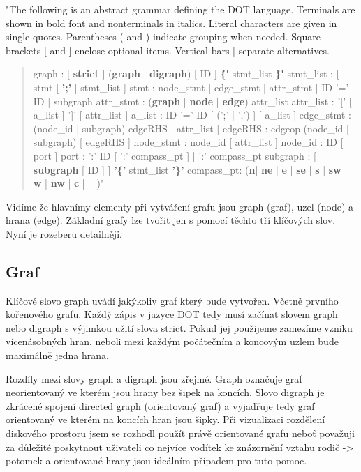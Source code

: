\documentclass[color,table,oneside,nolot,nolof]{fithesis}
\begin{document}
	"The following is an abstract grammar defining the DOT language. Terminals are shown in bold font and nonterminals in italics. Literal characters are given in single quotes. Parentheses
	( and ) indicate grouping when needed. Square brackets [ and ] enclose optional items. Vertical bars | separate alternatives.
	\begin{quotation}
	graph			:		[ \textbf{strict} ] (\textbf{graph} | \textbf{digraph}) [ ID ] \textbf{\'\{\'} stmt\_list \textbf{\'\}\'}
	stmt\_list :		[ stmt [ \textbf{';'} ] stmt\_list ]
	stmt			:		node\_stmt
	|							edge\_stmt
	|							attr\_stmt
	|							ID '=' ID
	|							subgraph
	attr\_stmt	:	(\textbf{graph} | \textbf{node} | \textbf{edge}) attr\_list
	attr\_list	:	'[' [ a\_list ] ']' [ attr\_list ]
	a\_list  	:	ID '=' ID [ (';' | ',') ] [ a\_list ]
	edge\_stmt	:	(node\_id | subgraph) edgeRHS [ attr\_list ]
	edgeRHS		:	edgeop (node\_id | subgraph) [ edgeRHS ]
	node\_stmt	:	node\_id [ attr\_list ]
	node\_id		:	ID [ port ]
	port			:	':' ID [ ':' compass\_pt ]
	|						':' compass\_pt
	subgraph	:	[ \textbf{subgraph} [ ID ] ] \textbf{'\{'} stmt\_list \textbf{'\}'}
	compass\_pt:	(\textbf{n}| \textbf{ne} | \textbf{e} | \textbf{se} | \textbf{s} | \textbf{sw} | \textbf{w}  | \textbf{nw} | \textbf{c} | \textbf{\_})"
	\end{quotation}

	Vidíme že hlavnímy elementy při vytváření grafu jsou graph (graf), uzel (node) a hrana (edge). Základní grafy lze tvořit jen s pomocí těchto tří klíčových slov. Nyní je rozeberu detailněji.

\subsection{Graf}
	Klíčové slovo graph uvádí jakýkoliv graf který bude vytvořen. Včetně prvního kořenového grafu. Každý zápis v jazyce DOT tedy musí začínat slovem graph nebo digraph s výjimkou užití slova
	strict. Pokud jej použijeme zamezíme vzniku vícenásobných hran, neboli mezi každým počátečním a koncovým uzlem bude maximálně jedna hrana. 

	Rozdíly mezi slovy graph a digraph jsou zřejmé. Graph označuje graf neorientovaný ve kterém jsou hrany bez šipek na koncích. Slovo digraph je zkrácené spojení directed graph (orientovaný
	graf) a vyjadřuje tedy graf orientovaný ve kterém na koncích hran jsou šipky. Při vizualizaci rozdělení diskového prostoru jsem se rozhodl použít právě orientované grafu neboť považuji za 
	důležité poskytnout uživateli co nejvíce vodítek ke znázornění vztahu rodič -> potomek a orientované hrany jsou ideálním případem pro tuto pomoc. 
\end{document}
